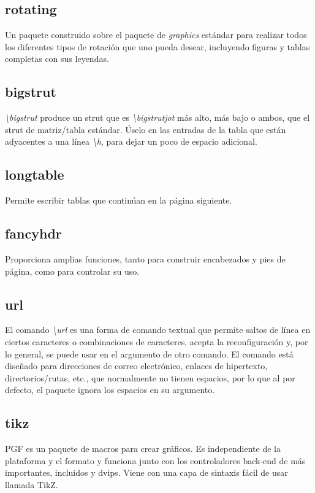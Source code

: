 \documentclass[12pt]{article}
\begin{document}
\subsection{rotating}
Un paquete construido sobre el paquete de  \textit{graphics} estándar para realizar todos los diferentes tipos de rotación que uno pueda desear, incluyendo figuras y tablas completas con sus leyendas.\cite{rotating}
\subsection{bigstrut}
\textit{\textbackslash bigstrut} produce un strut que es \textit{\textbackslash bigstrutjot} más alto, más bajo o ambos, que el strut de matriz/tabla estándar. Úselo en las entradas de la tabla que están adyacentes a una línea \textit{\textbackslash h}, para dejar un poco de espacio adicional.\cite{bigstrut}
\subsection{longtable}
Permite escribir tablas que continúan en la página siguiente.\cite{longtable}
\subsection{fancyhdr}
Proporciona amplias funciones, tanto para construir encabezados y pies de página, como para controlar su uso.\cite{fancyhdr}
\subsection{url}
El comando \textit{\textbackslash url} es una forma de comando textual que permite saltos de línea en ciertos caracteres o combinaciones de caracteres, acepta la reconfiguración y, por lo general, se puede usar en el argumento de otro comando. El comando está diseñado para direcciones de correo electrónico, enlaces de hipertexto, directorios/rutas, etc., que normalmente no tienen espacios, por lo que al por defecto, el paquete ignora los espacios en su argumento.\cite{url}
\subsection{tikz}
PGF es un paquete de macros para crear gráficos. Es independiente de la plataforma y el formato y funciona junto con los controladores back-end de  más importantes, incluidos  y dvips. Viene con una capa de sintaxis fácil de usar llamada TikZ.\cite{tikz}
\end{document}
